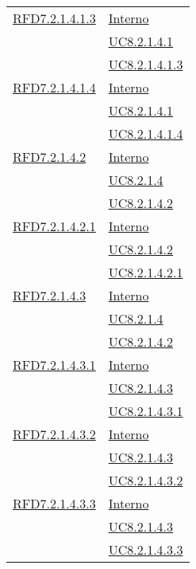 \begin{longtable}{|>{\centering}m{5cm}|m{5cm}<{\centering}|}
\hyperlink{RFD7.2.1.4.1.3}{RFD7.2.1.4.1.3} & \hyperlink{Interno}{Interno}\\
& \hyperref[UC8.2.1.4.1]{UC8.2.1.4.1}\\
& \hyperref[UC8.2.1.4.1.3]{UC8.2.1.4.1.3}\\ \hline

\hyperlink{RFD7.2.1.4.1.4}{RFD7.2.1.4.1.4} & \hyperlink{Interno}{Interno}\\
& \hyperref[UC8.2.1.4.1]{UC8.2.1.4.1}\\
& \hyperref[UC8.2.1.4.1.4]{UC8.2.1.4.1.4}\\ \hline

\hyperlink{RFD7.2.1.4.2}{RFD7.2.1.4.2} & \hyperlink{Interno}{Interno}\\
& \hyperref[UC8.2.1.4]{UC8.2.1.4}\\
& \hyperref[UC8.2.1.4.2]{UC8.2.1.4.2}\\ \hline

\hyperlink{RFD7.2.1.4.2.1}{RFD7.2.1.4.2.1} & \hyperlink{Interno}{Interno}\\
& \hyperref[UC8.2.1.4.2]{UC8.2.1.4.2}\\
& \hyperref[UC8.2.1.4.2.1]{UC8.2.1.4.2.1}\\ \hline

\hyperlink{RFD7.2.1.4.3}{RFD7.2.1.4.3} & \hyperlink{Interno}{Interno}\\
& \hyperref[UC8.2.1.4]{UC8.2.1.4}\\
& \hyperref[UC8.2.1.4.2]{UC8.2.1.4.2}\\ \hline

\hyperlink{RFD7.2.1.4.3.1}{RFD7.2.1.4.3.1} & \hyperlink{Interno}{Interno}\\
& \hyperref[UC8.2.1.4.3]{UC8.2.1.4.3}\\
& \hyperref[UC8.2.1.4.3.1]{UC8.2.1.4.3.1}\\ \hline

\hyperlink{RFD7.2.1.4.3.2}{RFD7.2.1.4.3.2} & \hyperlink{Interno}{Interno}\\
& \hyperref[UC8.2.1.4.3]{UC8.2.1.4.3}\\
& \hyperref[UC8.2.1.4.3.2]{UC8.2.1.4.3.2}\\ \hline

\hyperlink{RFD7.2.1.4.3.3}{RFD7.2.1.4.3.3} & \hyperlink{Interno}{Interno}\\
& \hyperref[UC8.2.1.4.3]{UC8.2.1.4.3}\\
& \hyperref[UC8.2.1.4.3.3]{UC8.2.1.4.3.3}\\ \hline


\end{longtable}
